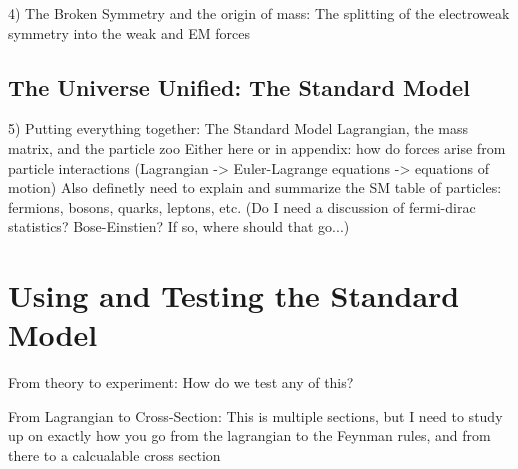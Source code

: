     4) The Broken Symmetry and the origin of mass:
        The splitting of the electroweak symmetry into the weak and EM forces

    \subsection{The Universe Unified: The Standard Model}

    5) Putting everything together: The Standard Model Lagrangian, the mass matrix, and the particle zoo
        Either here or in appendix: how do forces arise from particle interactions (Lagrangian -> Euler-Lagrange equations -> equations of motion)
        Also definetly need to explain and summarize the SM table of particles: fermions, bosons, quarks, leptons, etc.
        (Do I need a discussion of fermi-dirac statistics? Bose-Einstien? If so, where should that go...)


\section{Using and Testing the Standard Model}

    From theory to experiment: How do we test any of this?
        
    From Lagrangian to Cross-Section:
        This is multiple sections, but I need to study up on exactly how you go from the lagrangian to the Feynman rules, and from there to a calcualable cross section



